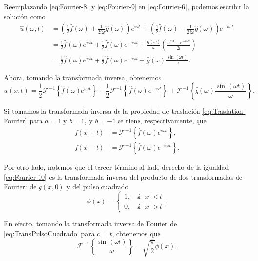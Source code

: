 \begin{ejemplo}
Reemplazando \eqref{eq:Fourier-8} y \eqref{eq:Fourier-9} en \eqref{eq:Fourier-6}, podemos escribir la solución como
\begin{align}
  \hat{u}(\omega,t) &= \left( \frac{1}{2} \hat{f}(\omega) + \frac{1}{2i\omega} \hat{g}(\omega)\right) e^{i\omega t} + \left( \frac{1}{2} \hat{f}(\omega) - \frac{1}{2i\omega} \hat{g}(\omega)\right) e^{-i\omega t} \nonumber\\
  &= \frac{1}{2} \hat{f}(\omega) e^{i\omega t} + \frac{1}{2} \hat{f}(\omega) e^{-i\omega t} + \frac{\hat{g}(\omega)}{\omega}\left(\frac{e^{i\omega t} - e^{-i\omega t}}{2i} \right) \nonumber \\
  &= \frac{1}{2} \hat{f}(\omega) e^{i\omega t} + \frac{1}{2} \hat{f}(\omega) e^{-i\omega t} + \hat{g}(\omega) \frac{\sin(\omega t)}{\omega}.
\end{align}

Ahora, tomando la transformada inversa, obtenemos
\begin{equation}
    u(x,t) = \frac{1}{2} \mathcal{F}^{-1}\left\{\hat{f}(\omega) e^{i\omega t}\right\} + \frac{1}{2} \mathcal{F}^{-1}\left\{\hat{f}(\omega) e^{-i\omega t}\right\} + \mathcal{F}^{-1}\left\{\hat{g}(\omega) \frac{\sin(\omega t)}{\omega}\right\}. \label{eq:Fourier-10}
\end{equation}

Si tomamos la transformada inversa de la propiedad de traslación \eqref{eq:Traslation-Fourier} para $a = 1$ y $b = 1$, y $b = -1$ se tiene, respectivamente, que
\begin{align}
    f(x + t) &= \mathcal{F}^{-1}\left\{\hat{f}(\omega) e^{i\omega t}\right\}, \label{eq:Fourier-11}\\
    f(x - t) &= \mathcal{F}^{-1}\left\{\hat{f}(\omega) e^{-i\omega t}\right\}. \label{eq:Fourier-12}
\end{align}

Por otro lado, notemos que el tercer término al lado derecho de la igualdad \eqref{eq:Fourier-10} es la transformada inversa del producto de dos transformadas de Fourier: de $g(x,0)$ y del pulso cuadrado
\begin{equation}
    \phi(x) = \left\{ \begin{array}{cl}
       1, & \text{si $|x| < t$}  \\
       0,  & \text{si $|x| > t$} 
    \end{array}\right. . 
\end{equation}

En efecto, tomando la transformada inversa de Fourier de \eqref{eq:TransPulsoCuadrado} para $a = t$, obtenemos que
\begin{equation}
    \mathcal{F}^{-1}\left\{ \frac{\sin(\omega t)}{\omega} \right\} = \sqrt{\frac{\pi}{2}} \phi(x). \label{eq:Fourier-13}
\end{equation}


\end{ejemplo}
